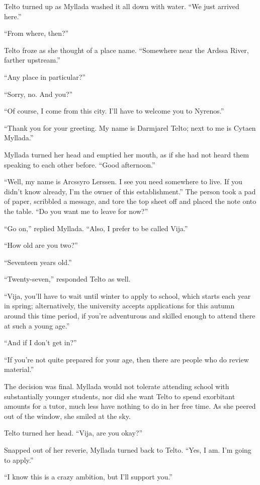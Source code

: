 Telto turned up as Myllada washed it all down with water. ``We just arrived here.''

``From where, then?''

Telto froze as she thought of a place name. ``Somewhere near the Ardssa River, farther upstream.''

``Any place in particular?''

``Sorry, no. And you?''

``Of course, I come from this city. I'll have to welcome you to Nyrenos.''

``Thank you for your greeting. My name is Darmjarel Telto; next to me is Cytaen Myllada.''

Myllada turned her head and emptied her mouth, as if she had not heard them speaking to each other before. ``Good afternoon.''

``Well, my name is Arcssyro Lerssen. I see you need somewhere to live. If you didn't know already, I'm the owner of this establishment.'' The person took a pad of paper, scribbled a message, and tore the top sheet off and placed the note onto the table. ``Do you want me to leave for now?''

``Go on,'' replied Myllada. ``Also, I prefer to be called Vija.''

``How old are you two?''

``Seventeen years old.''

``Twenty-seven,'' responded Telto as well.

``Vija, you'll have to wait until winter to apply to school, which starts each year in spring; alternatively, the university accepts applications for this autumn around this time period, if you're adventurous and skilled enough to attend there at such a young age.''

``And if I don't get in?''

``If you're not quite prepared for your age, then there are people who do review material.''

The decision was final. Myllada would not tolerate attending school with substantially younger students, nor did she want Telto to spend exorbitant amounts for a tutor, much less have nothing to do in her free time. As she peered out of the window, she smiled at the sky.

Telto turned her head. ``Vija, are you okay?''

Snapped out of her reverie, Myllada turned back to Telto. ``Yes, I am. I'm going to apply.''

``I know this is a crazy ambition, but I'll support you.''

